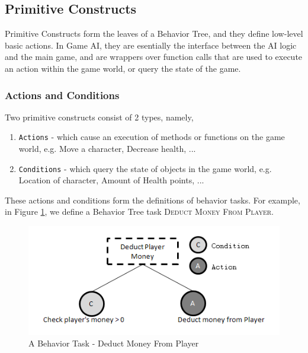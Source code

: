         \subsection{Primitive Constructs}
            
            
            Primitive Constructs form the leaves of a Behavior Tree, and they define low-level basic actions. In Game AI, they are esentially the interface between the AI logic and the main game, and are wrappers over function calls that are used to execute an action within the game world, or query the state of the game. 
            
            \subsubsection{Actions and Conditions}
                
            Two primitive constructs consist of 2 types, namely,           
            
            \begin{enumerate}
            \item \texttt{Actions} - which cause an execution of methods or functions on the game world, e.g. Move a character, Decrease health, ...
            \item \texttt{Conditions} - which query the state of objects in the game world, e.g. Location of character, Amount of Health points, ...
            \end{enumerate}        
       
            These actions and conditions form the definitions of behavior tasks. For example, in Figure \ref{img:primitives}, we define a Behavior Tree task \textsc{Deduct Money From Player}. 
             
            \begin{figure}[h]
                \begin{center}
                \includegraphics[scale=0.5]{images/primitives.png}
                \caption{A Behavior Task - Deduct Money From Player}
                \label{img:primitives}
                \end{center}            
            \end{figure}     
            
